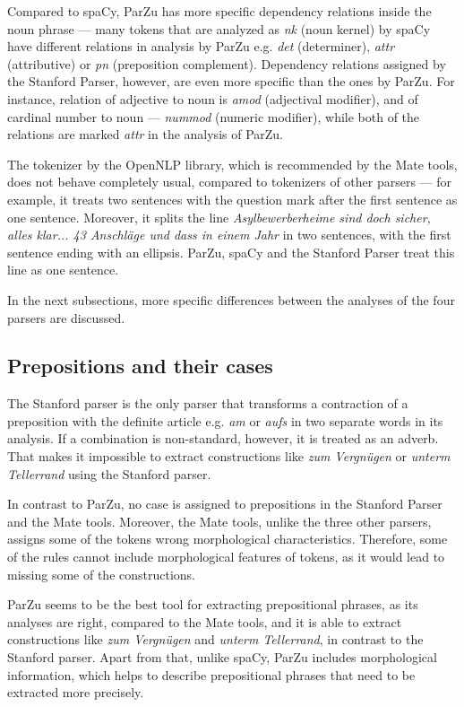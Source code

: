 Compared to spaCy, ParZu has more specific dependency relations inside the noun phrase --- many tokens that are analyzed as \textit{nk} (noun kernel) by spaCy have different relations in analysis by ParZu e.g. \textit{det} (determiner), \textit{attr} (attributive) or \textit{pn} (preposition complement). Dependency relations assigned by the Stanford Parser, however, are even more specific than the ones by ParZu. For instance, relation of adjective to noun is \textit{amod} (adjectival modifier), and of cardinal number to noun --- \textit{nummod} (numeric modifier), while both of the relations are marked \textit{attr} in the analysis of ParZu. 

The tokenizer by the OpenNLP library, which is recommended by the Mate tools, does not behave completely usual, compared to tokenizers of other parsers --- for example, it treats two sentences with the question mark after the first sentence as one sentence. Moreover, it splits the line \textit{Asylbewerberheime sind doch sicher, alles klar... 43 Anschläge und dass in einem Jahr} in two sentences, with the first sentence ending with an ellipsis. ParZu, spaCy and the Stanford Parser treat this line as one sentence.

In the next subsections, more specific differences between the analyses of the four parsers are discussed.

\subsection{Prepositions and their cases}

The Stanford parser is the only parser that transforms a contraction of a preposition with the definite article e.g. \textit{am} or \textit{aufs} in two separate words in its analysis. If a combination is non-standard, however, it is treated as an adverb. That makes it impossible to extract constructions like \textit{zum Vergnügen} or \textit{unterm Tellerrand} using the Stanford parser.

In contrast to ParZu, no case is assigned to prepositions in the Stanford Parser and the Mate tools. Moreover, the Mate tools, unlike the three other parsers, assigns some of the tokens wrong morphological characteristics. Therefore, some of the rules cannot include morphological features of tokens, as it would lead to missing some of the constructions.

ParZu seems to be the best tool for extracting prepositional phrases, as its analyses are right, compared to the Mate tools, and it is able to extract constructions like \textit{zum Vergnügen} and \textit{unterm Tellerrand}, in contrast to the Stanford parser. Apart from that, unlike spaCy, ParZu includes morphological information, which helps to describe prepositional phrases that need to be extracted more precisely.

